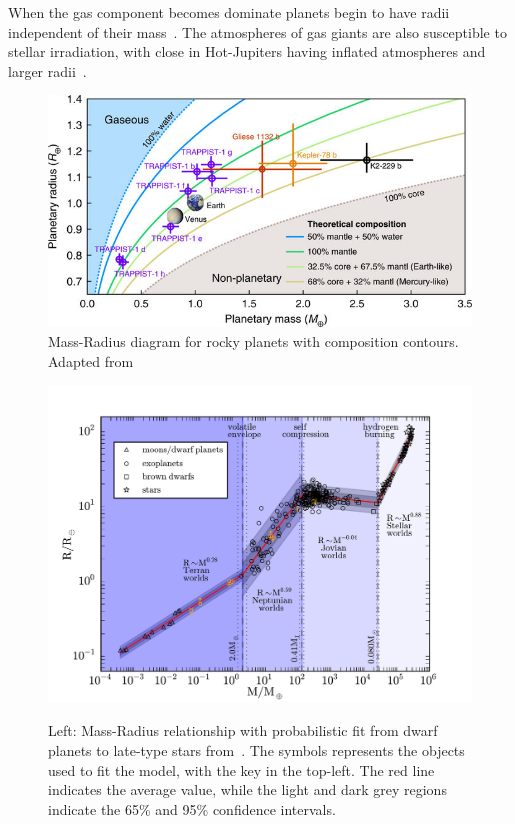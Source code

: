 When the gas component becomes dominate planets begin to have radii independent of their mass~\citep[e.g.][]{lopez_understanding_2014}.
The atmospheres of gas giants are also susceptible to stellar irradiation, with close in Hot-Jupiters having inflated atmospheres and larger radii~\citep[e.g][]{fortney_interior_2010}.

\begin{figure}
    \centering
    \includegraphics[width=0.7\linewidth]{figures/introduction/santerne_2018}
    \caption{Mass-Radius diagram for rocky planets with composition contours.
        Adapted from~\citet{santerne_earthsized_2018}}
    \label{fig:santerne2018}
\end{figure}


\begin{figure}
    \centering
    \includegraphics[width=0.9\linewidth]{./figures/introduction/mass_radius_relation.pdf}  \\
    \caption{Left: Mass-Radius relationship with probabilistic fit from dwarf planets to late-type stars from~\citet{chen_probabilistic_2016}.
    The symbols represents the objects used to fit the model, with the key in the top-left.
    The red line indicates the average value, while the light and dark grey regions indicate the 65\% and 95\% confidence intervals.}
    \label{fig:mass_radius_relation}
\end{figure}

